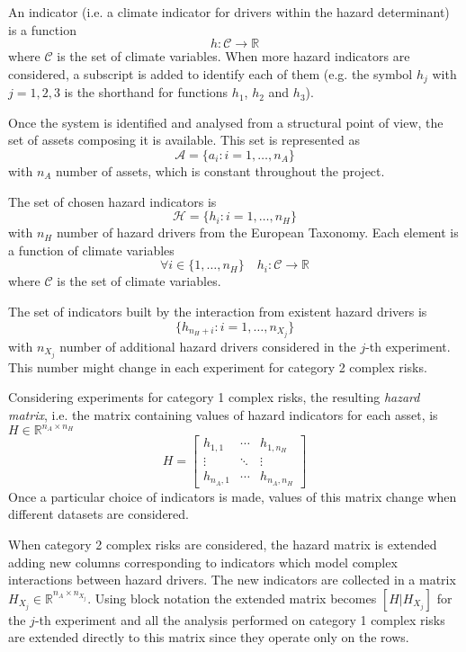 \documentclass{article}
\begin{document}
An indicator (i.e. a climate indicator for drivers within the hazard determinant) is a function
\begin{equation}
  \label{eq:indicator}
  h : \mathcal{C} \to \mathbb{R}
\end{equation}
where $\mathcal{C}$ is the set of climate variables. When more hazard indicators are considered, a subscript is added to identify each of them (e.g. the symbol $h_j$ with $j = 1, 2, 3$ is the shorthand for functions $h_1$, $h_2$ and $h_3$).

Once the system is identified and analysed from a structural point of view, the set of assets composing it is available. This set is represented as
\begin{equation}
  \mathcal{A} = \{ a_i : i = 1, \dots, n_A \}
\end{equation}
with $n_A$ number of assets, which is constant throughout the project.

The set of chosen hazard indicators is
\begin{equation}
  \mathcal{H} = \{ h_i : i = 1, \dots, n_H \}
\end{equation}
with $n_H$ number of hazard drivers from the European Taxonomy.  %
Each element is a function of climate variables
\begin{equation}
  \forall i \in \{ 1, \dots, n_H \} \quad h_i : \mathcal{C} \to \mathbb{R}
\end{equation}
where $\mathcal{C}$ is the set of climate variables.

The set of indicators built by the interaction from existent hazard drivers is
\begin{equation}
  \{ h_{n_H + i} : i = 1, \dots, n_{X_j} \}
\end{equation}
with $n_{X_j}$ number of additional hazard drivers considered in the $j$-th experiment. This number might change in each experiment for category 2 complex risks.

Considering experiments for category 1 complex risks, the resulting \emph{hazard matrix}, i.e. the matrix containing values of hazard indicators for each asset, is $H \in \mathbb{R}^{n_A \times n_H}$
\begin{equation}
  H =
  \begin{bmatrix}
    h_{1, 1}   & \cdots & h_{1, n_H}   \\
    \vdots     & \ddots & \vdots       \\
    h_{n_A, 1} & \cdots & h_{n_A, n_H}
  \end{bmatrix}
\end{equation}
Once a particular choice of indicators is made, values of this matrix change when different datasets are considered.

When category 2 complex risks are considered, the hazard matrix is extended adding new columns corresponding to indicators which model complex interactions between hazard drivers. The new indicators are collected in a matrix $H_{X_j} \in \mathbb{R}^{n_A \times n_{X_j}}$.
Using block notation the extended matrix becomes $[H | H_{X_j}]$ for the $j$-th experiment and all the analysis performed on category 1 complex risks are extended directly to this matrix since they operate only on the rows.
\end{document}

